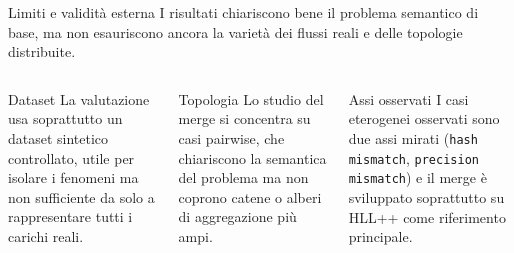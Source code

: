 \documentclass[aspectratio=169,11pt]{beamer}
\begin{document}
\begin{frame}{Limiti e validit\`a esterna}
  I risultati chiariscono bene il problema semantico di base, ma non
  esauriscono ancora la variet\`a dei flussi reali e delle topologie distribuite.

  \vspace{0.12cm}

  \begin{columns}[T,onlytextwidth]
      \begin{block}{Dataset}
        \footnotesize
        La valutazione usa soprattutto un dataset sintetico controllato, utile
        per isolare i fenomeni ma non sufficiente da solo a rappresentare tutti i
        carichi reali.
      \end{block}
      \begin{block}{Topologia}
        \footnotesize
        Lo studio del merge si concentra su casi pairwise, che chiariscono la
        semantica del problema ma non coprono catene o alberi di aggregazione pi\`u ampi.
      \end{block}
      \begin{block}{Assi osservati}
        \footnotesize
        I casi eterogenei osservati sono due assi mirati
        (\texttt{hash mismatch}, \texttt{precision mismatch}) e il merge \`e
        sviluppato soprattutto su HLL++ come riferimento principale.
      \end{block}
  \end{columns}
\end{frame}
\end{document}
